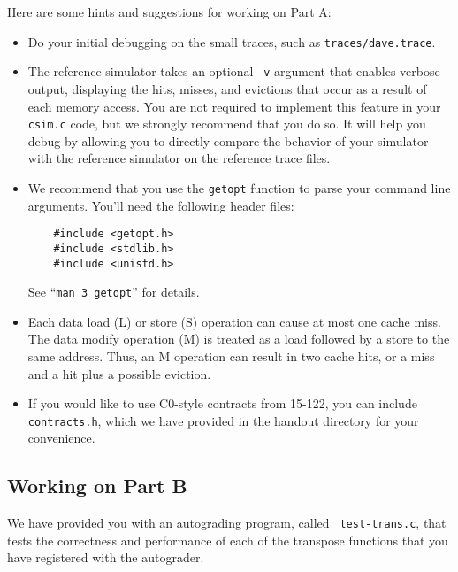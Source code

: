 \documentclass[11pt]{article}
\begin{document}
Here are some hints and suggestions for working on Part A:
\begin{itemize}
\item Do your initial debugging on the small traces, such as
  \verb:traces/dave.trace:.

\item The reference simulator takes an optional \texttt{-v} argument
  that enables verbose output, displaying the hits, misses, and
  evictions that occur as a result of each memory access. You are
  not required to implement this feature in your {\tt csim.c} code,
  but we strongly recommend that you do so.  It will help you debug by
  allowing you to directly compare the behavior of your simulator with
  the reference simulator on the reference trace files.

\item We recommend that you use the {\tt getopt} function to parse
  your command line arguments. You'll need the following header files:
\begin{verbatim}
    #include <getopt.h> 
    #include <stdlib.h> 
    #include <unistd.h>	
\end{verbatim}
See ``{\tt man 3 getopt}'' for details. 

\item Each data load (L) or store (S) operation can cause at most one
  cache miss.  The data modify operation (M) is treated as a load
  followed by a store to the same address. Thus, an M operation can
  result in two cache hits, or a miss and a hit plus a possible
  eviction.

\item If you would like to use C0-style contracts from 15-122, you can
  include \verb+contracts.h+, which we have provided in the handout
  directory for your convenience.

\end{itemize}

\subsection{Working on Part B}
We have provided you with an autograding program, called {\tt
  test-trans.c}, that tests the correctness and performance of each of
the transpose functions that you have registered with the autograder. 
\end{document}
